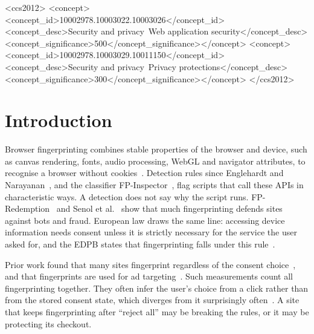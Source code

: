 \documentclass[sigconf,review,anonymous]{acmart}
\begin{document}
\begin{CCSXML}
<ccs2012>
<concept><concept_id>10002978.10003022.10003026</concept_id>
<concept_desc>Security and privacy~Web application security</concept_desc>
<concept_significance>500</concept_significance></concept>
<concept><concept_id>10002978.10003029.10011150</concept_id>
<concept_desc>Security and privacy~Privacy protections</concept_desc>
<concept_significance>300</concept_significance></concept>
</ccs2012>
\end{CCSXML}

\maketitle

\section{Introduction}
Browser fingerprinting combines stable properties of the browser and device, such as canvas
rendering, fonts, audio processing, WebGL and navigator attributes, to recognise a browser
without cookies~\cite{eckersley2010unique,mowery2012pixel,laperdrix2020survey}. Detection rules
since Englehardt and Narayanan~\cite{englehardt2016online}, and the classifier
FP-Inspector~\cite{iqbal2021fingerprinting}, flag scripts that call these APIs in characteristic
ways. A detection does not say why the script runs. FP-Redemption~\cite{durey2021fpredemption}
and Senol et al.~\cite{senol2024doubleedged} show that much fingerprinting defends sites against
bots and fraud. European law draws the same line: accessing device information needs consent
unless it is strictly necessary for the service the user asked for, and the EDPB states that
fingerprinting falls under this rule~\cite{edpb2023scope}.

Prior work found that many sites fingerprint regardless of the consent
choice~\cite{papadogiannakis2021postcookie}, and that fingerprints are used for ad
targeting~\cite{liu2025fptrace}. Such measurements count all fingerprinting together. They often
infer the user's choice from a click rather than from the stored consent state, which
diverges from it surprisingly often~\cite{matte2020cookie}. A site that keeps fingerprinting after
``reject all'' may be breaking the rules, or it may be protecting its checkout.
\end{document}
